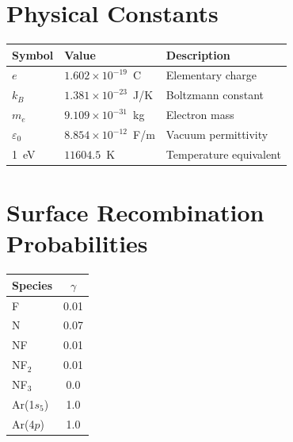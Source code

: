 \documentclass[11pt,a4paper]{article}
\begin{document}
\section{Physical Constants}

\begin{table}[H]
  \centering
  \begin{tabular}{lll}
    \toprule
    \textbf{Symbol} & \textbf{Value} & \textbf{Description} \\
    \midrule
    $e$           & $1.602\times10^{-19}$~C     & Elementary charge \\
    $k_B$         & $1.381\times10^{-23}$~J/K   & Boltzmann constant \\
    $m_e$         & $9.109\times10^{-31}$~kg    & Electron mass \\
    $\varepsilon_0$ & $8.854\times10^{-12}$~F/m & Vacuum permittivity \\
    1~eV          & $11604.5$~K                  & Temperature equivalent \\
    \bottomrule
  \end{tabular}
\end{table}

\section{Surface Recombination Probabilities}

\begin{table}[H]
  \centering
  \begin{tabular}{lc}
    \toprule
    \textbf{Species} & $\gamma$ \\
    \midrule
    F        & 0.01 \\
    N        & 0.07 \\
    NF       & 0.01 \\
    NF$_2$   & 0.01 \\
    NF$_3$   & 0.0  \\
    Ar(1$s_5$) & 1.0 \\
    Ar(4$p$)   & 1.0 \\
    \bottomrule
  \end{tabular}
\end{table}
\end{document}
